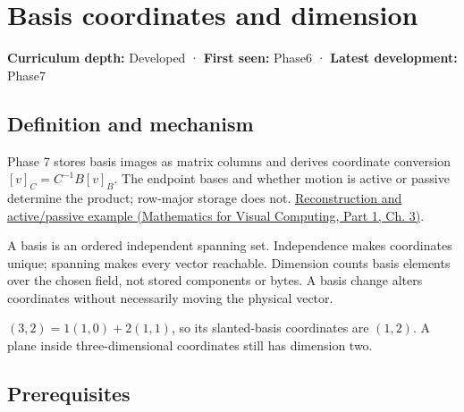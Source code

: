 \hypertarget{appendix-ce0341f7ea0d}{}\label{referencestart:appendix-ce0341f7ea0d}
\section{Basis coordinates and dimension}\label{appendix-ce0341f7ea0d-basis-coordinates-and-dimension}

\hypertarget{appendix-ce0341f7ea0d-basis-coordinates-and-dimension}{}

\textbf{Curriculum depth:} Developed · \textbf{First seen:} Phase6 · \textbf{Latest development:} Phase7

\begin{allmightroledefinition}

\subsection{Definition and mechanism}\label{appendix-ce0341f7ea0d-definition-and-mechanism}

\hypertarget{appendix-ce0341f7ea0d-definition-and-mechanism}{}

Phase 7 stores basis images as matrix columns and derives coordinate conversion \([v]_C=C^{-1}B[v]_B\). The endpoint bases and whether motion is active or passive determine the product; row-major storage does not. \href{../02-Mathematics-for-Visual-Computing-P01/main.pdf\#nameddest=01-foundations-i-ch019-coordinates-can-change-while-the-geometric-object-stays-still}{Reconstruction and active/passive example (Mathematics for Visual Computing, Part 1, Ch. 3)}.

\end{allmightroledefinition}

A basis is an ordered independent spanning set. Independence makes coordinates unique; spanning makes every vector reachable. Dimension counts basis elements over the chosen field, not stored components or bytes. A basis change alters coordinates without necessarily moving the physical vector.

\((3,2)=1(1,0)+2(1,1)\), so its slanted-basis coordinates are \((1,2)\). A plane inside three-dimensional coordinates still has dimension two.

\subsection{Prerequisites}\label{appendix-ce0341f7ea0d-prerequisites}

\hypertarget{appendix-ce0341f7ea0d-prerequisites}{}

